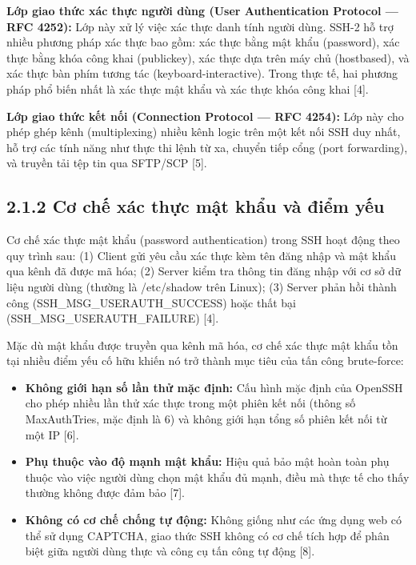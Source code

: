 \documentclass[
  a4paper]{report}
\providecommand{\tightlist}{%
  \setlength{\itemsep}{0pt}\setlength{\parskip}{0pt}}
\begin{document}
\textbf{Lớp giao thức xác thực người dùng (User Authentication Protocol
--- RFC 4252):} Lớp này xử lý việc xác thực danh tính người dùng. SSH-2
hỗ trợ nhiều phương pháp xác thực bao gồm: xác thực bằng mật khẩu
(password), xác thực bằng khóa công khai (publickey), xác thực dựa trên
máy chủ (hostbased), và xác thực bàn phím tương tác
(keyboard-interactive). Trong thực tế, hai phương pháp phổ biến nhất là
xác thực mật khẩu và xác thực khóa công khai {[}4{]}.

\textbf{Lớp giao thức kết nối (Connection Protocol --- RFC 4254):} Lớp
này cho phép ghép kênh (multiplexing) nhiều kênh logic trên một kết nối
SSH duy nhất, hỗ trợ các tính năng như thực thi lệnh từ xa, chuyển tiếp
cổng (port forwarding), và truyền tải tệp tin qua SFTP/SCP {[}5{]}.

\subsection{2.1.2 Cơ chế xác thực mật khẩu và điểm
yếu}\label{cux1a1-chux1ebf-xuxe1c-thux1ef1c-mux1eadt-khux1ea9u-vuxe0-ux111iux1ec3m-yux1ebfu}

Cơ chế xác thực mật khẩu (password authentication) trong SSH hoạt động
theo quy trình sau: (1) Client gửi yêu cầu xác thực kèm tên đăng nhập và
mật khẩu qua kênh đã được mã hóa; (2) Server kiểm tra thông tin đăng
nhập với cơ sở dữ liệu người dùng (thường là /etc/shadow trên Linux);
(3) Server phản hồi thành công (SSH\_MSG\_USERAUTH\_SUCCESS) hoặc thất
bại (SSH\_MSG\_USERAUTH\_FAILURE) {[}4{]}.

Mặc dù mật khẩu được truyền qua kênh mã hóa, cơ chế xác thực mật khẩu
tồn tại nhiều điểm yếu cố hữu khiến nó trở thành mục tiêu của tấn công
brute-force:

\begin{itemize}
\tightlist
\item
  \textbf{Không giới hạn số lần thử mặc định:} Cấu hình mặc định của
  OpenSSH cho phép nhiều lần thử xác thực trong một phiên kết nối (thông
  số MaxAuthTries, mặc định là 6) và không giới hạn tổng số phiên kết
  nối từ một IP {[}6{]}.
\item
  \textbf{Phụ thuộc vào độ mạnh mật khẩu:} Hiệu quả bảo mật hoàn toàn
  phụ thuộc vào việc người dùng chọn mật khẩu đủ mạnh, điều mà thực tế
  cho thấy thường không được đảm bảo {[}7{]}.
\item
  \textbf{Không có cơ chế chống tự động:} Không giống như các ứng dụng
  web có thể sử dụng CAPTCHA, giao thức SSH không có cơ chế tích hợp để
  phân biệt giữa người dùng thực và công cụ tấn công tự động {[}8{]}.
\end{itemize}
\end{document}

